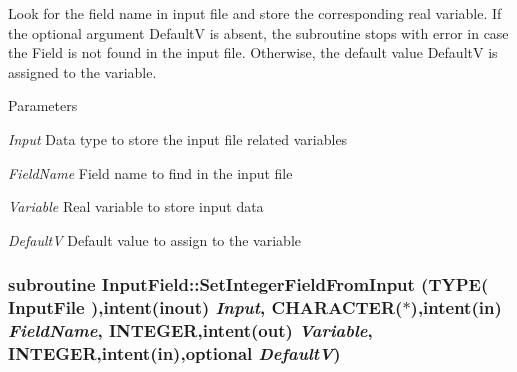 Look for the field name in input file and store the corresponding real variable. If the optional argument DefaultV is absent, the subroutine stops with error in case the Field is not found in the input file. Otherwise, the default value DefaultV is assigned to the variable. 
\begin{DoxyParams}{Parameters}
\item[{\em Input}]Data type to store the input file related variables \item[{\em FieldName}]Field name to find in the input file \item[{\em Variable}]Real variable to store input data \item[{\em DefaultV}]Default value to assign to the variable \end{DoxyParams}
\hypertarget{namespace_input_field_ac3f69e3960e1f451a3e6fe072075f90f}{
\subsubsection[{SetIntegerFieldFromInput}]{\setlength{\rightskip}{0pt plus 5cm}subroutine InputField::SetIntegerFieldFromInput (TYPE( InputFile ),intent(inout) {\em Input}, \/  CHARACTER($\ast$),intent(in) {\em FieldName}, \/  INTEGER,intent(out) {\em Variable}, \/  INTEGER,intent(in),optional {\em DefaultV})}}
\label{namespace_input_field_ac3f69e3960e1f451a3e6fe072075f90f}


